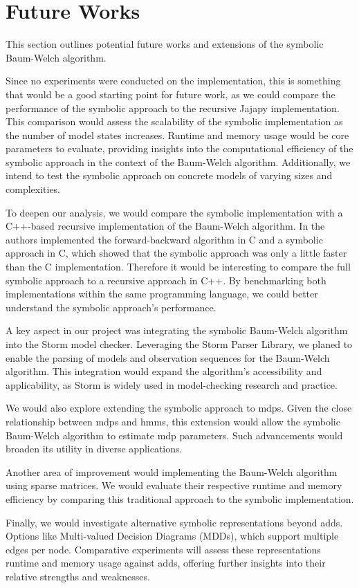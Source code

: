 \section{Future Works}\label{sec:future_works}
This section outlines potential future works and extensions of the symbolic Baum-Welch algorithm.

Since no experiments were conducted on the implementation, this is something that would be a good starting point for future work, as we could compare the performance of the symbolic approach to the recursive Jajapy implementation.
This comparison would assess the scalability of the symbolic implementation as the number of model states increases. 
Runtime and memory usage would be core parameters to evaluate, providing insights into the computational efficiency of the symbolic approach in the context of the Baum-Welch algorithm.
Additionally, we intend to test the symbolic approach on concrete models of varying sizes and complexities. 

To deepen our analysis, we would compare the symbolic implementation with a C++-based recursive implementation of the Baum-Welch algorithm. 
In \cite{p7} the authors implemented the forward-backward algorithm in C and a symbolic approach in C, which showed that the symbolic approach was only a little faster than the C implementation.
Therefore it would be interesting to compare the full symbolic approach to a recursive approach in C++.
By benchmarking both implementations within the same programming language, we could better understand the symbolic approach's performance.

A key aspect in our project was integrating the symbolic Baum-Welch algorithm into the Storm model checker. 
Leveraging the Storm Parser Library, we planed to enable the parsing of models and observation sequences for the Baum-Welch algorithm.
This integration would expand the algorithm's accessibility and applicability, as Storm is widely used in model-checking research and practice.

We would also explore extending the symbolic approach to \glspl{mdp}. 
Given the close relationship between \glspl{mdp} and \glspl{hmm}, this extension would allow the symbolic Baum-Welch algorithm to estimate \gls{mdp} parameters. 
Such advancements would broaden its utility in diverse applications.

Another area of improvement would implementing the Baum-Welch algorithm using sparse matrices. 
We would evaluate their respective runtime and memory efficiency by comparing this traditional approach to the symbolic implementation. 

Finally, we would investigate alternative symbolic representations beyond \glspl{add}. 
Options like Multi-valued Decision Diagrams (MDDs), which support multiple edges per node.
Comparative experiments will assess these representations runtime and memory usage against \glspl{add}, offering further insights into their relative strengths and weaknesses.